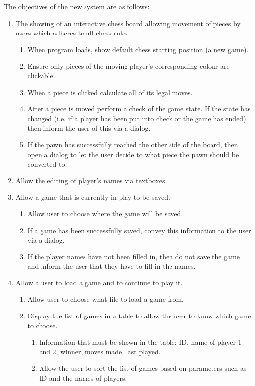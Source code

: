 The objectives of the new system are as follows:
\begin{enumerate}
	\item The showing of an interactive chess board allowing movement of pieces by users which adheres to all chess rules.
	\begin{enumerate}
		\item When program loads, show default chess starting position (a new game).
		\item Ensure only pieces of the moving player's corresponding colour are clickable.
		\item When a piece is clicked calculate all of its legal moves.
		\item After a piece is moved perform a check of the game state. If the state has changed (i.e. if a player has been put into check or the game has ended) then inform the user of this via a dialog.
		\item If the pawn has successfully reached the other side of the board, then open a dialog to let the user decide to what piece the pawn should be converted to.
	\end{enumerate}
	\item Allow the editing of player's names via textboxes.
	\item Allow a game that is currently in play to be saved.
	\begin{enumerate}
		\item Allow user to choose where the game will be saved.
		\item If a game has been successfully saved, convey this information to the user via a dialog.
		\item If the player names have not been filled in, then do not save the game and inform the user that they have to fill in the names.
	\end{enumerate}
	\item Allow a user to load a game and to continue to play it.
	\begin{enumerate}
		\item Allow user to choose what file to load a game from.
		\item Display the list of games in a table to allow the user to know which game to choose.
		\begin{enumerate}
			\item Information that must be shown in the table: ID, name of player 1 and 2, winner, moves made, last played.
			\item Allow the user to sort the list of games based on parameters such as ID and the names of players.
		\end{enumerate}
	\end{enumerate}
\end{enumerate}